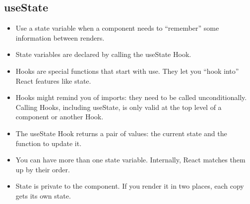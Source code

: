 \subsection{useState}
\begin{itemize}
    \item Use a state variable when a component needs to ``remember'' some information between renders.
    \item State variables are declared by calling the useState Hook.
    \item Hooks are special functions that start with use. They let you ``hook into'' React features like state.
    \item Hooks might remind you of imports: they need to be called unconditionally. Calling Hooks, including useState, is only valid at the top level of a component or another Hook.
    \item The useState Hook returns a pair of values: the current state and the function to update it.
    \item You can have more than one state variable. Internally, React matches them up by their order.
    \item State is private to the component. If you render it in two places, each copy gets its own state.
\end{itemize}

